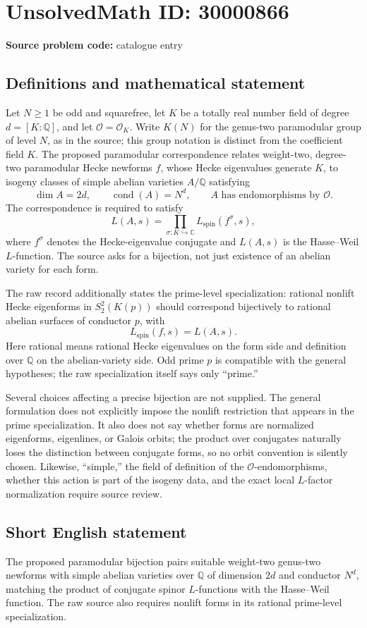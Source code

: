 \documentclass[11pt]{article}
\newcommand{\Q}{\mathbb{Q}}
\newcommand{\C}{\mathbb{C}}
\begin{document}
\section*{UnsolvedMath ID: 30000866}
\textbf{Source problem code:} catalogue entry
\subsection{Definitions and mathematical statement}
Let \(N\geq1\) be odd and squarefree, let \(K\) be a totally real number field of degree \(d=[K:\Q]\), and let \(\mathcal O=\mathcal O_K\). Write \(K(N)\) for the genus-two paramodular group of level \(N\), as in the source; this group notation is distinct from the coefficient field \(K\). The proposed paramodular correspondence relates weight-two, degree-two paramodular Hecke newforms \(f\), whose Hecke eigenvalues generate \(K\), to isogeny classes of simple abelian varieties \(A/\Q\) satisfying
\[
\dim A=2d,\qquad \operatorname{cond}(A)=N^d,
\qquad A\text{ has endomorphisms by }\mathcal O.
\]
The correspondence is required to satisfy
\[
L(A,s)=\prod_{\sigma:K\hookrightarrow\C}L_{\mathrm{spin}}(f^\sigma,s),
\]
where \(f^\sigma\) denotes the Hecke-eigenvalue conjugate and \(L(A,s)\) is the Hasse--Weil \(L\)-function. The source asks for a bijection, not just existence of an abelian variety for each form.

The raw record additionally states the prime-level specialization: rational nonlift Hecke eigenforms in \(S_2^2(K(p))\) should correspond bijectively to rational abelian surfaces of conductor \(p\), with
\[
L_{\mathrm{spin}}(f,s)=L(A,s).
\]
Here rational means rational Hecke eigenvalues on the form side and definition over \(\Q\) on the abelian-variety side. Odd prime \(p\) is compatible with the general hypotheses; the raw specialization itself says only ``prime.''

Several choices affecting a precise bijection are not supplied. The general formulation does not explicitly impose the nonlift restriction that appears in the prime specialization. It also does not say whether forms are normalized eigenforms, eigenlines, or Galois orbits; the product over conjugates naturally loses the distinction between conjugate forms, so no orbit convention is silently chosen. Likewise, ``simple,'' the field of definition of the \(\mathcal O\)-endomorphisms, whether this action is part of the isogeny data, and the exact local \(L\)-factor normalization require source review.
\subsection{Short English statement}
The proposed paramodular bijection pairs suitable weight-two genus-two newforms with simple abelian varieties over \(\Q\) of dimension \(2d\) and conductor \(N^d\), matching the product of conjugate spinor \(L\)-functions with the Hasse--Weil function. The raw source also requires nonlift forms in its rational prime-level specialization.
\end{document}
